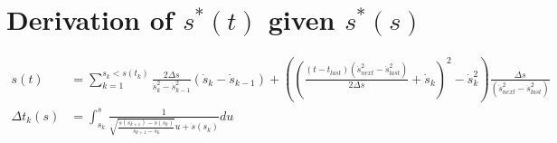 \chapter{Derivation of $s^*(t)$ given $s^*(s)$}

\begin{align*}
s(t) &= \sum_{k=1}^{s_k < s(t_k)} \frac{2\Delta s}{\dot{s}^2_k - \dot{s}^2_{k-1}} \left(\dot{s}_k -\dot{s}_{k-1}\right) + \left(\left(\frac{(t-t_{last})(\dot{s}^2_{next} - \dot{s}^2_{last})}{2 \Delta s} + \dot{s}_k\right)^2 - \dot{s}^2_k \right)\frac{\Delta s}{(\dot{s}^2_{next} - \dot{s}^2_{last})}\\	
\Delta t_k(s) &= \int_{s_k}^s \frac{1}{\sqrt{\frac{\dot{s}(s_{k+1}) - \dot{s}(s_{k})}{s_{k+1} - s_{k}}} u + \dot{s}(s_{k})} du
\end{align*}